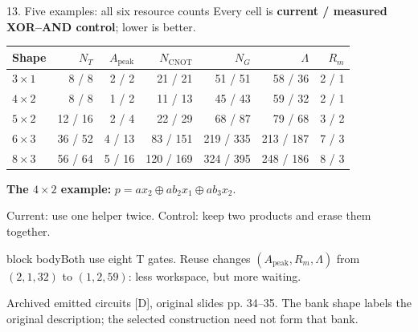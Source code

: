 \documentclass[aspectratio=169,11pt]{beamer}
\newcommand{\src}[1]{\par\vfill{\fontsize{6.6}{7.8}\selectfont\color{muted}#1\par}}
\newcommand{\takeaway}[1]{\par\smallskip\begin{beamercolorbox}[sep=1.4mm,wd=\linewidth]{block body}\small #1\end{beamercolorbox}}
\newcommand{\labeltext}[1]{{\color{accent}\bfseries #1}}
\begin{document}
\begin{frame}[t]{13. Five examples: all six resource counts}
\small
Every cell is \textbf{current / measured XOR--AND control}; lower is better.
\begin{center}
\setlength{\tabcolsep}{5pt}
\renewcommand{\arraystretch}{1.05}
\begin{tabular}{@{}lrrrrrr@{}}
\toprule
Shape & $N_T$ & $A_{\mathrm{peak}}$ & $N_{\mathrm{CNOT}}$ & $N_G$ & $\Lambda$ & $R_m$\\
\midrule
$3\!\times\!1$ & 8 / 8 & 2 / 2 & 21 / 21 & 51 / 51 & 58 / 36 & 2 / 1\\
$4\!\times\!2$ & 8 / 8 & 1 / 2 & 11 / 13 & 45 / 43 & 59 / 32 & 2 / 1\\
$5\!\times\!2$ & 12 / 16 & 2 / 4 & 22 / 29 & 68 / 87 & 79 / 68 & 3 / 2\\
$6\!\times\!3$ & 36 / 52 & 4 / 13 & 83 / 151 & 219 / 335 & 213 / 187 & 7 / 3\\
$8\!\times\!3$ & 56 / 64 & 5 / 16 & 120 / 169 & 324 / 395 & 248 / 186 & 8 / 3\\
\bottomrule
\end{tabular}
\end{center}
\labeltext{The $4\times2$ example:} $p=ax_2\oplus ab_2x_1\oplus ab_3x_2$.

\smallskip
Current: use one helper twice. Control: keep two products and erase them together.
\takeaway{Both use eight T gates. Reuse changes $(A_{\mathrm{peak}},R_m,\Lambda)$ from $(2,1,32)$ to $(1,2,59)$: less workspace, but more waiting.}
\src{Archived emitted circuits [D], original slides pp. 34--35. The bank shape labels the original description; the selected construction need not form that bank.}
\end{frame}
\end{document}
